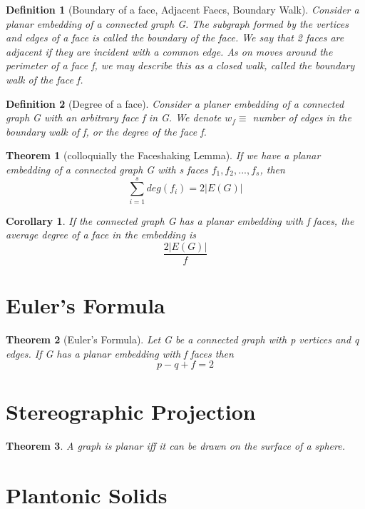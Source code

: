 \documentclass[11pt, oneside]{book}
\theoremstyle{break}
\newtheorem{thm}{Theorem}[section]
\newtheorem{crly}{Corollary}[thm]
\newtheorem{defn}{Definition}[section]
\begin{document}
\begin{defn}[Boundary of a face, Adjacent Faecs, Boundary Walk]
	Consider a planar embedding of a connected graph G. The subgraph formed by the vertices and edges of a face is called the boundary of the face. We say that 2 faces are adjacent if they are incident with a common edge. As on moves around the perimeter of a face f, we may describe this as a closed walk, called the boundary walk of the face f.
\end{defn}

\begin{defn}[Degree of a face]
	Consider a planer embedding of a connected graph G with an arbitrary face f in G. We denote $w_f \equiv$ number of edges in the boundary walk of f, or the degree of the face f.
\end{defn}

\begin{thm}[colloquially the Faceshaking Lemma]
	If we have a planar embedding of a connected graph G with s faces $f_1, f_2, ..., f_s$, then
	\[
		\sum_{i=1}^{s}deg(f_i) = 2| E(G) |	
	\]
\end{thm}

\begin{crly}
	If the connected graph G has a planar embedding with f faces, the average degree of a face in the embedding is
	\[
		\frac{2|E(G)|}{f}
	\]
\end{crly}


\section{Euler's Formula}

\begin{thm}[Euler's Formula]
	Let G be a connected graph with p vertices and q edges. If G has a planar embedding with f faces then
	\[
		p - q + f = 2
	\]
\end{thm}


\section{Stereographic Projection}

\begin{thm}
	A graph is planar iff it can be drawn on the surface of a sphere.
\end{thm}


\section{Plantonic Solids}
\end{document}
